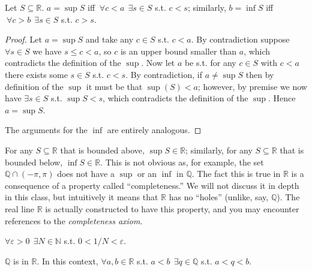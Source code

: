 \documentclass{article}
\begin{document}
\begin{claim}
  Let $S \subseteq \mathbb{R}$. $a = \sup S$ iff $~ \forall c < a ~~ \exists s \in S$ s.t. $c < s$; similarly, $b = \inf S$ iff $~ \forall c > b ~~ \exists s \in S$ s.t. $c > s$.
\end{claim}

\begin{proof}
  Let $a = \sup S$ and take any $c \in S$ s.t. $c < a$. By contradiction suppose $\forall s \in S$ we have $s \le c < a$, so $c$ is an upper bound smaller than $a$, which contradicts the definition of the $\sup$. Now let $a$ be s.t. for any $c \in S$ with $c < a$ there exists some $s \in S$ s.t. $c < s$. By contradiction, if $a \ne \sup S$ then by definition of the $\sup$ it must be that $\sup(S) < a$; however, by premise we now have $\exists s \in S$ s.t. $\sup S < s$, which contradicts the definition of the $\sup$. Hence $a = \sup S$.

  The arguments for the $\inf$ are entirely analogous.
\end{proof}

\begin{remark}
  For any $S \subseteq \mathbb{R}$ that is bounded above, $\sup S \in \mathbb{R}$; similarly, for any $S \subseteq \mathbb{R}$ that is bounded below, $\inf S \in \mathbb{R}$. This is not obvious as, for example, the set $\mathbb{Q} \cap (-\pi, \pi)$ does not have a $\sup$ or an $\inf$ in $\mathbb{Q}$. The fact this is true in $\mathbb{R}$ is a consequence of a property called ``completeness.'' We will not discuss it in depth in this class, but intuitively it means that $\mathbb{R}$ has no ``holes'' (unlike, say, $\mathbb{Q}$). The real line $\mathbb{R}$ is actually constructed to have this property, and you may encounter references to the \textit{completeness axiom}.
\end{remark}

\begin{definitionx}\label{def:lecture1_archimedean}
  $\forall \varepsilon > 0 ~~ \exists N \in \mathbb{N}$ s.t. $0 < 1/N < \varepsilon$.
\end{definitionx}

\begin{claim}
  $\mathbb{Q}$ is  in $\mathbb{R}$. In this context, $\forall a, b \in \mathbb{R}$ s.t. $a < b ~~ \exists q \in \mathbb{Q}$ s.t. $a < q < b$.
\end{claim}
\end{document}
